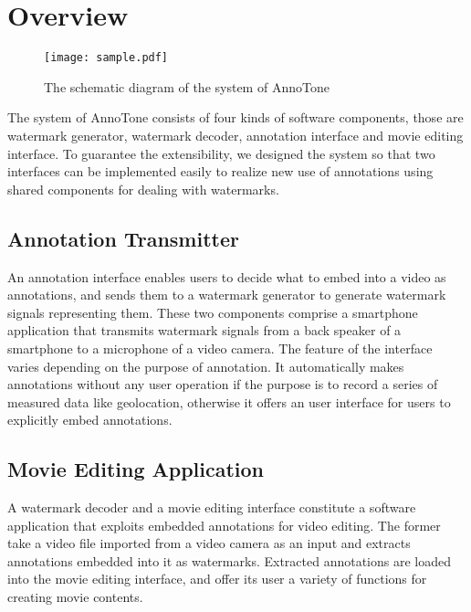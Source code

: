 \chapter{Overview}

\begin{figure}[htbp]
 \begin{center}
  \texttt{[image: sample.pdf]}
 \end{center}
 \caption{The schematic diagram of the system of AnnoTone}
 \label{fig:one}
\end{figure}

The system of AnnoTone consists of four kinds of software components, those are watermark generator, watermark decoder, annotation interface and movie editing interface.
To guarantee the extensibility, we designed the system so that two interfaces can be implemented easily to realize new use of annotations using shared components for dealing with watermarks.

\section{Annotation Transmitter}
An annotation interface enables users to decide what to embed into a video as annotations, and sends them to a watermark generator to generate watermark signals representing them.
These two components comprise a smartphone application that transmits watermark signals from a back speaker of a smartphone to a microphone of a video camera.
The feature of the interface varies depending on the purpose of annotation.
It automatically makes annotations without any user operation if the purpose is to record a series of measured data like geolocation, otherwise it offers an user interface for users to explicitly embed annotations.

\section{Movie Editing Application}
A watermark decoder and a movie editing interface constitute a software application that exploits embedded annotations for video editing.
The former take a video file imported from a video camera as an input and extracts annotations embedded into it as watermarks.
Extracted annotations are loaded into the movie editing interface, and offer its user a variety of functions for creating movie contents.
